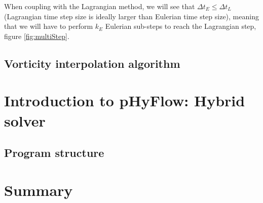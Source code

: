 When coupling with the Lagrangian method, we will see that $\Delta t_E \leqslant \Delta t_L$ (Lagrangian time step size is ideally larger than Eulerian time step size), meaning that we will have to perform $k_E$ Eulerian sub-steps to reach the Lagrangian step, figure \ref{fig:multiStep}.

\subsection{Vorticity interpolation algorithm}

\section{Introduction to pHyFlow: Hybrid solver}

\subsection{Program structure}

\section{Summary}




